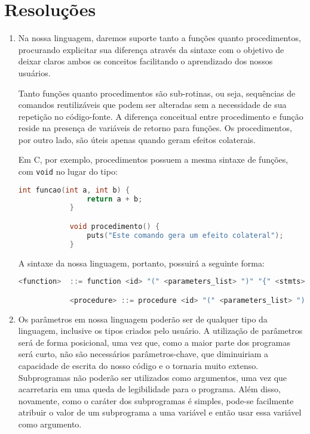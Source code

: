 \documentclass[12pt, a4paper]{article}
\begin{document}
\section{Resoluções}
    \begin{enumerate}
        \item
        Na nossa linguagem, daremos suporte tanto a funções quanto
        procedimentos, procurando explicitar sua diferença através da sintaxe
        com o objetivo de deixar claros ambos os conceitos facilitando o
        aprendizado dos nossos usuários.

        Tanto funções quanto procedimentos são sub-rotinas, ou seja, sequências
        de comandos reutilizáveis que podem ser alteradas sem a necessidade de
        sua repetição no código-fonte. A diferença conceitual entre
        procedimento e função reside na presença de variáveis de retorno para
        funções. Os procedimentos, por outro lado, são úteis apenas quando
        geram efeitos colaterais.

        Em C, por exemplo, procedimentos possuem a mesma sintaxe de funções,
        com \texttt{void} no lugar do tipo:

        \begin{lstlisting}[language=C]
            int funcao(int a, int b) {
                return a + b;
            }

            void procedimento() {
                puts("Este comando gera um efeito colateral");
            }
        \end{lstlisting}

        A sintaxe da nossa linguagem, portanto, possuirá a seguinte forma:

        \begin{lstlisting}[language=C]
            <function>  ::= function <id> "(" <parameters_list> ")" "{" <stmts> <return_stmt> "}"

            <procedure> ::= procedure <id> "(" <parameters_list> ")" "{" <stmts> "}"
        \end{lstlisting}

        \item
        Os parâmetros em nossa linguagem poderão ser de qualquer tipo da
        linguagem, inclusive os tipos criados pelo usuário. A utilização de
        parâmetros será de forma posicional, uma vez que, como a maior parte
        dos programas será curto, não são necessários parâmetros-chave, que
        diminuiriam a capacidade de escrita do nosso código e o tornaria muito
        extenso. Subprogramas não poderão ser utilizados como argumentos, uma
        vez que acarretaria em uma queda de legibilidade para o programa. Além
        disso, novamente, como o caráter dos subprogramas é simples, pode-se
        facilmente atribuir o valor de um subprograma a uma variável e então
        usar essa variável como argumento.


\end{enumerate}
\end{document}
